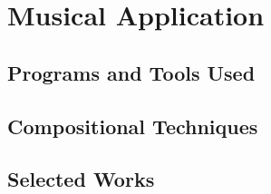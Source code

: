 \chapter{Musical Application}
\section{Programs and Tools Used}
\section{Compositional Techniques}
\section{Selected Works}
